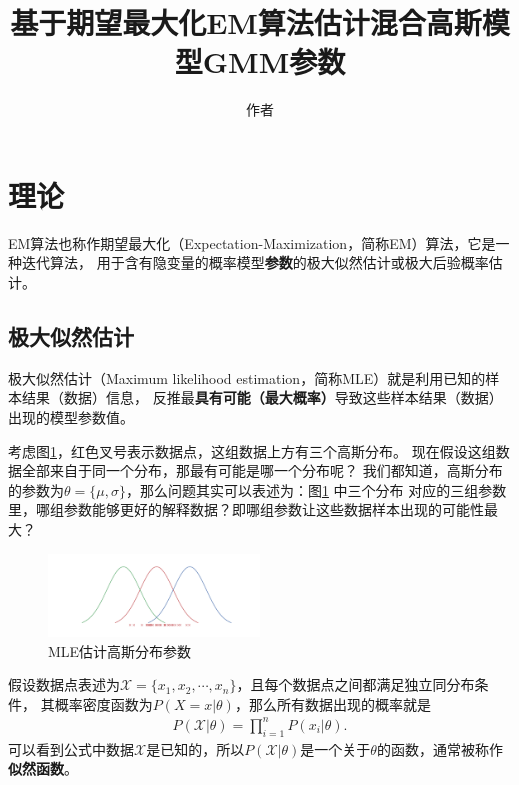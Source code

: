 \documentclass[UTF8]{ctexart}
\begin{document}
\title{基于期望最大化EM算法估计混合高斯模型GMM参数}
\author{作者}
\maketitle

\section{理论}

EM算法也称作期望最大化（Expectation-Maximization，简称EM）算法，它是一种迭代算法，
用于含有隐变量的概率模型\textbf{参数}的极大似然估计或极大后验概率估计。

\subsection{极大似然估计}
\label{subsection-1}

极大似然估计（Maximum likelihood estimation，简称MLE）就是利用已知的样本结果（数据）信息，
反推最\textbf{具有可能（最大概率）}导致这些样本结果（数据）出现的模型参数值。

考虑图\ref{MLE}，红色叉号表示数据点，这组数据上方有三个高斯分布。
现在假设这组数据全部来自于同一个分布，那最有可能是哪一个分布呢？
我们都知道，高斯分布的参数为$\theta=\{\mu, \sigma\}$，那么问题其实可以表述为：图\ref{MLE} 中三个分布
对应的三组参数里，哪组参数能够更好的解释数据？即哪组参数让这些数据样本出现的可能性最大？

\begin{figure}[!h]
  \includegraphics[width=0.5\textwidth]{./figures/MLE.pdf}
  \centering
  \caption{MLE估计高斯分布参数}
  \label{MLE}
\end{figure}

假设数据点表述为$\mathcal{X}=\{x_1, x_2, \cdots, x_n\}$，且每个数据点之间都满足独立同分布条件，
其概率密度函数为$P(X=x|\theta)$，那么所有数据出现的概率就是
\begin{equation}\label{Likelihood}
  \begin{split}
    P(\mathcal{X}|\theta) = \prod_{i=1}^{n}P(x_i|\theta).
  \end{split}
\end{equation}
可以看到公式中数据$\mathcal{X}$是已知的，所以$P(\mathcal{X}|\theta)$是一个关于$\theta$的函数，通常被称作\textbf{似然函数}。
\end{document}
